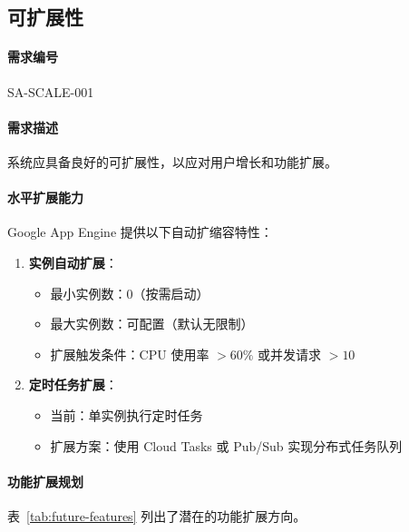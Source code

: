 \subsection{可扩展性}

\paragraph{需求编号} SA-SCALE-001

\paragraph{需求描述} 系统应具备良好的可扩展性，以应对用户增长和功能扩展。

\paragraph{水平扩展能力}

Google App Engine 提供以下自动扩缩容特性：

\begin{enumerate}
    \item \textbf{实例自动扩展}：
          \begin{itemize}
              \item 最小实例数：0（按需启动）
              \item 最大实例数：可配置（默认无限制）
              \item 扩展触发条件：CPU 使用率 $> 60\%$ 或并发请求 $> 10$
          \end{itemize}

    \item \textbf{定时任务扩展}：
          \begin{itemize}
              \item 当前：单实例执行定时任务
              \item 扩展方案：使用 Cloud Tasks 或 Pub/Sub 实现分布式任务队列
          \end{itemize}
\end{enumerate}

\paragraph{功能扩展规划}

表~\ref{tab:future-features} 列出了潜在的功能扩展方向。


